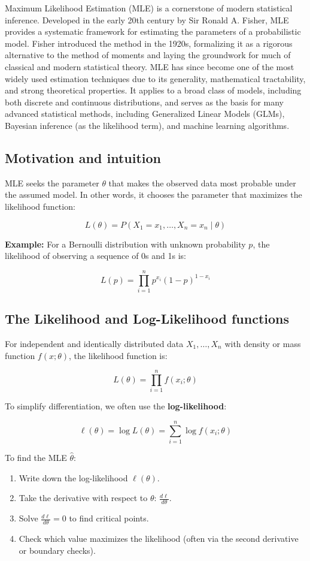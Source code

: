 \documentclass{book}
\begin{document}
Maximum Likelihood Estimation (MLE) is a cornerstone of modern statistical inference. Developed in the early 20th century by Sir Ronald A. Fisher, MLE provides a systematic framework for estimating the parameters of a probabilistic model. Fisher introduced the method in the 1920s, formalizing it as a rigorous alternative to the method of moments and laying the groundwork for much of classical and modern statistical theory.
MLE has since become one of the most widely used estimation techniques due to its generality, mathematical tractability, and strong theoretical properties. It applies to a broad class of models, including both discrete and continuous distributions, and serves as the basis for many advanced statistical methods, including Generalized Linear Models (GLMs), Bayesian inference (as the likelihood term), and machine learning algorithms.

\subsection{Motivation and intuition}
MLE seeks the parameter $\theta$ that makes the observed data most probable under the assumed model. In other words, it chooses the parameter that maximizes the likelihood function:

\[
L(\theta) = P(X_1 = x_1, \dots, X_n = x_n \mid \theta)
\]

\textbf{Example:} For a Bernoulli distribution with unknown probability $p$, the likelihood of observing a sequence of 0s and 1s is:

\[
L(p) = \prod_{i=1}^{n} p^{x_i}(1-p)^{1 - x_i}
\]

\subsection{The Likelihood and Log-Likelihood functions}

For independent and identically distributed data $X_1, \dots, X_n$ with density or mass function $f(x; \theta)$, the likelihood function is:

\[
L(\theta) = \prod_{i=1}^{n} f(x_i; \theta)
\]

To simplify differentiation, we often use the \textbf{log-likelihood}:

\[
\ell(\theta) = \log L(\theta) = \sum_{i=1}^{n} \log f(x_i; \theta)
\]

To find the MLE $\hat{\theta}$:

\begin{enumerate}
    \item Write down the log-likelihood $\ell(\theta)$.
    \item Take the derivative with respect to $\theta$: $\frac{d\ell}{d\theta}$.
    \item Solve $\frac{d\ell}{d\theta} = 0$ to find critical points.
    \item Check which value maximizes the likelihood (often via the second derivative or boundary checks).
\end{enumerate}
\end{document}
